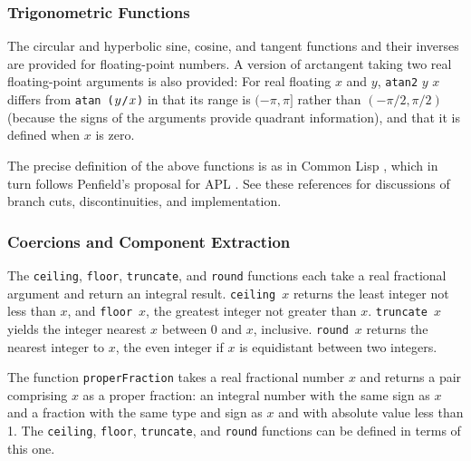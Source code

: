 {\subsubsection{Trigonometric Functions}

The circular and hyperbolic sine, cosine,
and tangent functions and their inverses are provided
for floating-point numbers.  A version of arctangent
taking two real floating-point arguments is also provided: For real floating
$x$ and $y$, \mbox{\tt atan2} $y$ $x$ differs from 
\mbox{\tt atan\ (}$y\/$\mbox{\tt /}$x\/$\mbox{\tt )} in that its range is 
$( -\pi , \pi ]$ rather than $(- \pi / 2 , \pi / 2 )$ (because the signs
of the arguments provide quadrant information), and that it is defined
when $x$ is zero.

The precise definition of the above functions is as in Common Lisp
\cite{steele:common-lisp}, which in turn follows Penfield's proposal
for APL
\cite{penfield:complex-apl}.
See these references for discussions of branch cuts, discontinuities,
and implementation.

\subsubsection{Coercions and Component Extraction}
\label{coercion}

The \mbox{\tt ceiling}, \mbox{\tt floor},
\mbox{\tt truncate}, and \mbox{\tt round}
functions each take a real fractional argument and return an integral
result.  \mbox{\mbox{\tt ceiling} $x$} returns the least integer not less than $x$, and
\mbox{\mbox{\tt floor} $x$}, the greatest integer not greater than $x$.  \mbox{\mbox{\tt truncate} $x$}
yields the integer nearest $x$ between $0$ and $x$, inclusive.
\mbox{\mbox{\tt round} $x$} returns the nearest integer to $x$, the even integer if
$x$ is equidistant between two integers.

The function \mbox{\tt properFraction} takes a real
fractional number $x$ and returns a pair comprising $x$ as a
proper fraction: an integral number with the same sign as $x$ and a
fraction with the same type and sign as $x$ and with absolute
value less than 1.  The \mbox{\tt ceiling}, \mbox{\tt floor}, \mbox{\tt truncate}, and \mbox{\tt round}
functions can be defined in terms of this one.

}
